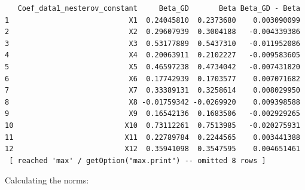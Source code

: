 \documentclass[
  letterpaper,
  DIV=11,
  numbers=noendperiod]{scrartcl}
\newenvironment{Shaded}{\begin{snugshade}}{\end{snugshade}}
\newcommand{\AttributeTok}[1]{\textcolor[rgb]{0.40,0.45,0.13}{#1}}
\newcommand{\DecValTok}[1]{\textcolor[rgb]{0.68,0.00,0.00}{#1}}
\newcommand{\FunctionTok}[1]{\textcolor[rgb]{0.28,0.35,0.67}{#1}}
\newcommand{\NormalTok}[1]{\textcolor[rgb]{0.00,0.23,0.31}{#1}}
\newcommand{\OtherTok}[1]{\textcolor[rgb]{0.00,0.23,0.31}{#1}}
\newcommand{\SpecialCharTok}[1]{\textcolor[rgb]{0.37,0.37,0.37}{#1}}
\newcommand{\StringTok}[1]{\textcolor[rgb]{0.13,0.47,0.30}{#1}}
\begin{document}
\begin{verbatim}
   Coef_data1_nesterov_constant     Beta_GD       Beta Beta_GD - Beta
1                            X1  0.24045810  0.2373680    0.003090099
2                            X2  0.29607939  0.3004188   -0.004339386
3                            X3  0.53177889  0.5437310   -0.011952086
4                            X4  0.20063911  0.2102227   -0.009583605
5                            X5  0.46597238  0.4734042   -0.007431820
6                            X6  0.17742939  0.1703577    0.007071682
7                            X7  0.33389131  0.3258614    0.008029950
8                            X8 -0.01759342 -0.0269920    0.009398588
9                            X9  0.16542136  0.1683506   -0.002929265
10                          X10  0.73112261  0.7513985   -0.020275931
11                          X11  0.22789784  0.2244565    0.003441388
12                          X12  0.35941098  0.3547595    0.004651461
 [ reached 'max' / getOption("max.print") -- omitted 8 rows ]
\end{verbatim}

Calculating the norms:

\begin{Shaded}
\end{Shaded}
\end{document}
